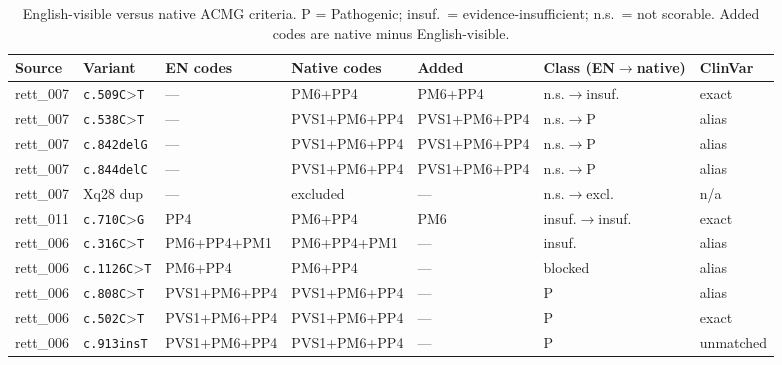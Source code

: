 \documentclass[12pt]{article}
\begin{document}
\begin{table}[htbp]
  \centering
  \caption{English-visible versus native ACMG criteria. P = Pathogenic;
  insuf.\ = evidence-insufficient; n.s.\ = not scorable. Added codes are
  native minus English-visible.}
  \label{tab:s3}
  \scriptsize
  \setlength{\tabcolsep}{2.5pt}
  \begin{tabular}{@{}llp{2.35cm}p{2.35cm}p{2.0cm}p{2.35cm}l@{}}
    \toprule
    \textbf{Source} & \textbf{Variant} & \textbf{EN codes} &
    \textbf{Native codes} & \textbf{Added} &
    \textbf{Class (EN$\to$native)} & \textbf{ClinVar} \\
    \midrule
    rett\_007 & \texttt{c.509C}\textgreater\texttt{T} & --- & PM6+PP4 & PM6+PP4 &
      n.s.$\to$insuf. & exact \\
    rett\_007 & \texttt{c.538C}\textgreater\texttt{T} & --- &
      PVS1+\allowbreak PM6+\allowbreak PP4 & PVS1+\allowbreak PM6+\allowbreak PP4 &
      n.s.$\to$P & alias \\
    rett\_007 & \texttt{c.842delG} & --- &
      PVS1+\allowbreak PM6+\allowbreak PP4 & PVS1+\allowbreak PM6+\allowbreak PP4 &
      n.s.$\to$P & alias \\
    rett\_007 & \texttt{c.844delC} & --- &
      PVS1+\allowbreak PM6+\allowbreak PP4 & PVS1+\allowbreak PM6+\allowbreak PP4 &
      n.s.$\to$P & alias \\
    rett\_007 & Xq28 dup & --- & excluded & --- &
      n.s.$\to$excl. & n/a \\
    rett\_011 & \texttt{c.710C}\textgreater\texttt{G} & PP4 & PM6+PP4 & PM6 &
      insuf.$\to$insuf. & exact \\
    rett\_006 & \texttt{c.316C}\textgreater\texttt{T} &
      PM6+\allowbreak PP4+\allowbreak PM1 & PM6+\allowbreak PP4+\allowbreak PM1 & --- &
      insuf. & alias \\
    rett\_006 & \texttt{c.1126C}\textgreater\texttt{T} & PM6+PP4 & PM6+PP4 & --- &
      blocked & alias \\
    rett\_006 & \texttt{c.808C}\textgreater\texttt{T} &
      PVS1+\allowbreak PM6+\allowbreak PP4 & PVS1+\allowbreak PM6+\allowbreak PP4 & --- &
      P & alias \\
    rett\_006 & \texttt{c.502C}\textgreater\texttt{T} &
      PVS1+\allowbreak PM6+\allowbreak PP4 & PVS1+\allowbreak PM6+\allowbreak PP4 & --- &
      P & exact \\
    rett\_006 & \texttt{c.913insT} &
      PVS1+\allowbreak PM6+\allowbreak PP4 & PVS1+\allowbreak PM6+\allowbreak PP4 & --- &
      P & unmatched \\

\end{tabular}
\end{table}
\end{document}
